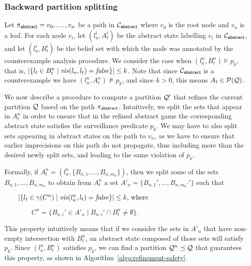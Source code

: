 \subsubsection{Backward partition splitting}
Let $\pi_{\mathsf{abstract}} = v_0,\ldots, v_n$ be a path in $\mathcal{C}_{\mathsf{abstract}}$ where $v_0$ is the root node and $v_n$ is a leaf. For each node $v_i$, let $(l_a^i,A_t^i) $ be the abstract state labelling $v_i$ in $\mathcal{C}_{\mathsf{abstract}}$, and let $(l_a^i,B_t^i)$ be the  belief set with which the node was annotated by the counterexample analysis procedure. We consider the case when $(l_a^n,B_t^n) \models p_k$, that is, $|\{l_t \in B_t^n \mid \mathit{vis}(l_a,l_t) = \mathit{false}\}| \leq k$.
Note that since $\mathcal{C}_{\mathsf{abstract}}$ is a counterexample we have $(l_a^n,A_t^n) \not \models p_k$, and since $k>0$, this means $A_t \in \mathcal{P}(\mathcal{Q})$.


We now describe a procedure to compute a partition $\mathcal{Q}'$ that refines the current partition $\mathcal{Q}$ based on the path $\pi_{\mathsf{abstract}}$. Intuitively, we split the sets that appear in $A_t^n$ in order to ensure that in the refined abstract game the corresponding abstract state satisfies the surveillance predicate $p_k$. We may have to also split sets appearing in abstract states on the path to $v_n$, as we have to ensure that earlier imprecisions on this path do not propagate, thus including more than the desired newly split sets, and leading to the same violation of $p_k$.

Formally, if $A_t^n = (l_a^n,\{B_{n,1},\ldots,B_{n,m_n}\})$, then we split some of the sets $B_{n,1},\ldots,B_{n,m_n}$ to obtain from $A_t^n$ a set $A'_n = \{B_{n,1}',\ldots,B_{n,m_n'}'\}$ such that

$\qquad|\{l_t \in \gamma(C^n) \mid \mathit{vis}(l_a^n,l_t) = \mathit{false}\}| \leq k \text{, where}$

$\qquad\qquad C^n = \{B_{n,i}' \in A'_n \mid B_{n,i}' \cap B_t^n \neq \emptyset\}.$

This property intuitively means that if we consider the sets in $A'_n$ that have non-empty intersection with $B_t^n$, an abstract state composed of those sets will satisfy $p_k$. Since $(l_a^n,B_t^n)$ satisfies $p_k$, we can find a partition $\mathcal{Q}^n \preceq \mathcal{Q}$ that guarantees this property, as shown in Algorithm~\ref{algo:refinement-safety}.
 
